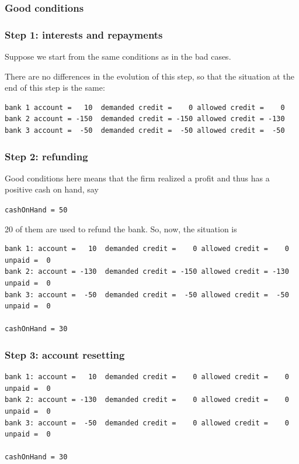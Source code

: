 \documentclass{article}
\begin{document}
\subsubsection{Good conditions}
	\subsubsection*{Step 1: interests and repayments}
	Suppose we start from the same conditions as in the bad cases.

	There are no differences in the evolution of this step, so that the situation at the end of this step is the same:
\begin{verbatim}
bank 1 account =   10  demanded credit =    0 allowed credit =    0
bank 2 account = -150  demanded credit = -150 allowed credit = -130 
bank 3 account =  -50  demanded credit =  -50 allowed credit =  -50
\end{verbatim}


	\subsubsection*{Step 2: refunding}
	Good conditions here means that the firm realized a profit and thus has a positive cash on hand, say

	\verb+cashOnHand = 50+

20 of them are used to refund the bank. So, now, the situation is 

\begin{verbatim}
bank 1: account =   10  demanded credit =    0 allowed credit =    0 unpaid =  0
bank 2: account = -130  demanded credit = -150 allowed credit = -130 unpaid =  0
bank 3: account =  -50  demanded credit =  -50 allowed credit =  -50 unpaid =  0

cashOnHand = 30
\end{verbatim}



	\subsubsection*{Step 3: account resetting}

\begin{verbatim}
bank 1: account =   10  demanded credit =    0 allowed credit =    0 unpaid =  0
bank 2: account = -130  demanded credit =    0 allowed credit =    0 unpaid =  0
bank 3: account =  -50  demanded credit =    0 allowed credit =    0 unpaid =  0

cashOnHand = 30
\end{verbatim}
\end{document}
